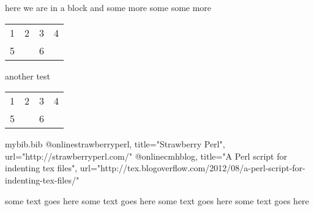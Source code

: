 here we are in a block
    and
        some
     more
        some
some more
\begin{tabular}{cccc}
	1 & 2 & 3 & 4 \\
	5 &   & 6 &   \\
\end{tabular}

another test
\begin{tabular}{cccc}
	1 & 2 & 3 & 4 \\
	5 &   & 6 &   \\
\end{tabular}

\begin{filecontents}{mybib.bib}
	@online{strawberryperl,
		title="Strawberry Perl",
		url="http://strawberryperl.com/"}
	@online{cmhblog,
		title="A Perl script for indenting tex files",
		url="http://tex.blogoverflow.com/2012/08/a-perl-script-for-indenting-tex-files/"}
\end{filecontents}

\begin{myotherenvironment}
	some text goes here
	some text goes here
	some text goes here
	some text goes here
\end{myotherenvironment}

